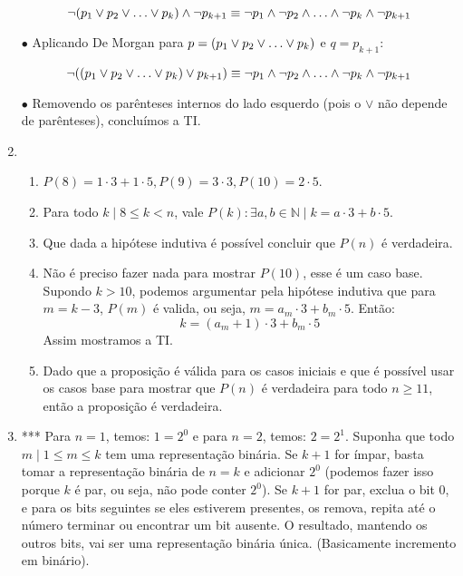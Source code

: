 \documentclass{article}
\begin{document}
\begin{enumerate}
	      \[  \neg (p_1 \lor p_2 \lor \mathellipsis \lor p_k) \land \neg p_{k+1} \equiv \neg p_1 \land \neg p_2 \land \mathellipsis \land \neg p_k \land \neg p_{k+1} \]

	      \( \bullet \) Aplicando De Morgan para \( p = (p_1 \lor p_2 \lor \mathellipsis \lor p_k) \) e \( q = p_{k+1} \):

	      \[ \neg ((p_1 \lor p_2 \lor \mathellipsis \lor p_k) \lor p_{k+1} ) \equiv \neg p_1 \land \neg p_2 \land \mathellipsis \land \neg p_k \land \neg p_{k+1} \]

	      \( \bullet \) Removendo os parênteses internos do lado esquerdo (pois o $\lor$ não depende de parênteses), concluímos a TI.

	\item

	      \begin{enumerate}

		      \item \( P(8) = 1 \cdot 3 + 1 \cdot 5,  P(9) = 3 \cdot 3, P(10) = 2 \cdot 5 \).

		      \item Para todo \( k \mid 8 \leq k < n \), vale \( P(k): \exists a,b \in \mathbb{N} \mid k = a \cdot 3 + b \cdot 5\).

		      \item Que dada a hipótese indutiva é possível concluir que \( P(n) \) é verdadeira.

		      \item Não é preciso fazer nada para mostrar \( P(10) \), esse é um caso base. Supondo \( k > 10 \), podemos argumentar pela hipótese indutiva que para \( m = k - 3 \), \( P(m) \) é valida, ou seja, \( m = a_m \cdot 3 + b_m \cdot 5 \). Então:
		            \[ k = (a_m + 1) \cdot 3 + b_m \cdot 5 \]
		            Assim mostramos a TI.

		      \item Dado que a proposição é válida para os casos iniciais e que é possível usar os casos base para mostrar que \( P(n) \) é verdadeira para todo \( n \geq 11 \), então a proposição é verdadeira.

	      \end{enumerate}

	\item *** Para \( n = 1 \), temos: \( 1 = 2^0 \) e para \( n = 2 \), temos: \( 2 = 2^1 \). Suponha que todo \( m \mid 1 \leq m \leq k \) tem uma representação binária. Se \( k + 1 \) for ímpar, basta tomar a representação binária de \( n = k \) e adicionar \( 2^0 \) (podemos fazer isso porque \( k \) é par, ou seja, não pode conter \( 2^0 \)). Se \( k + 1 \) for par, exclua o bit 0, e para os bits seguintes se eles estiverem presentes, os remova, repita até o número terminar ou encontrar um bit ausente. O resultado, mantendo os outros bits, vai ser uma representação binária única. (Basicamente incremento em binário).


\end{enumerate}
\end{document}
